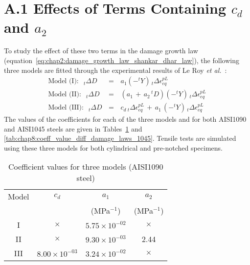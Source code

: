 \section*{A.1 Effects of Terms Containing $c_{d}$ and $a_{2}$}
 To study the effect of these two terms in the damage growth law (equation~\ref{eq:chap2:damage_growth_law_shankar_dhar_law}), the
 following three models are fitted through the experimental results of Le Roy \emph{et al.}~\cite{Leroy_1981}:
 \begin{eqnarray}
 \label{eq:chap8:diff_damage_growth_law}
 \mbox{Model (I)}:\;\; _{t}\Delta D\,&=&\,a_{1}(-^{t}Y)\,_{t}\Delta\epsilon^{pL}_{eq} \label{eq:chap8:damage_law_1} \\
 \mbox{Model (II)}:\;\;_{t}\Delta D\,&=&\,(a_{1}\,+\,a_{2}\,^{t}\!D)(-^{t}Y)\,_{t}\Delta\epsilon^{pL}_{eq} \label{eq:chap8:damage_law_2} \\
 \mbox{Model (III)}:\;\;_{t}\Delta D\,&=&\,c_{d} \,_{t}\Delta\epsilon^{pL}_{eq}\,+\,a_{1}\,(-^{t}Y)\,_{t}\Delta\epsilon^{pL}_{eq} \label{eq:chap8:damage_law_3}
 \end{eqnarray}
The values of the coefficients for each of the three models and for both AISI1090 and AISI1045 steels
are given in Tables~\ref{tab:chap8:coeff_value_diff_damage_laws_1090} and \ref{tab:chap8:coeff_value_diff_damage_laws_1045}. Tensile tests are simulated using
these three models for both cylindrical and pre-notched specimens.
\begin{table}[h]
\caption{Coefficient values for three models (AISI1090 steel)}
\begin{center}
\begin{tabular}{| c | c | c | c | }
\hline           Model & $c_{d}$  & $a_{1}$     & $a_{2}$   \\
                       &      &(MPa$^{-1}$) & (MPa$^{-1}$) \\
\hline
  I & $\times$ & $5.75\times10^{-02}$ & $\times$  \\
\hline
 II & $\times$ & $9.30\times10^{-03}$ & 2.44 \\
\hline
III & $8.00\times10^{-03}$ & $3.24\times10^{-02}$ & $\times$  \\
\hline
\end{tabular}
\end{center}
\label{tab:chap8:coeff_value_diff_damage_laws_1090}
\end{table}
